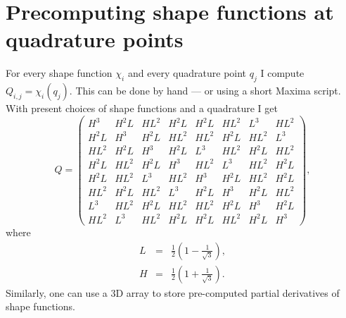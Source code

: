 \documentclass{article}
\begin{document}
\section{Precomputing shape functions at quadrature points}

For every shape function $\chi_i$ and every quadrature point $q_j$ I compute
$Q_{i, j} = \chi_i (q_j)$. This can be done by hand --- or using a short
Maxima script. With present choices of shape functions and a quadrature I get
\begin{equation}
  Q = \left(\begin{array}{llllllll}
    H^3 & H^2 L & HL^2 & H^2 L & H^2 L & HL^2 & L^3 & HL^2\\
    H^2 L & H^3 & H^2 L & HL^2 & HL^2 & H^2 L & HL^2 & L^3\\
    HL^2 & H^2 L & H^3 & H^2 L & L^3 & HL^2 & H^2 L & HL^2\\
    H^2 L & HL^2 & H^2 L & H^3 & HL^2 & L^3 & HL^2 & H^2 L\\
    H^2 L & HL^2 & L^3 & HL^2 & H^3 & H^2 L & HL^2 & H^2 L\\
    HL^2 & H^2 L & HL^2 & L^3 & H^2 L & H^3 & H^2 L & HL^2\\
    L^3 & HL^2 & H^2 L & HL^2 & HL^2 & H^2 L & H^3 & H^2 L\\
    HL^2 & L^3 & HL^2 & H^2 L & H^2 L & HL^2 & H^2 L & H^3
  \end{array} \right), \label{eq:shapefunctions}
\end{equation}
where
\begin{eqnarray*}
  L & = & \frac{1}{2} \left(1 - \frac{1}{\sqrt{3}} \right),\\
  H & = & \frac{1}{2} \left(1 + \frac{1}{\sqrt{3}} \right) .
\end{eqnarray*}
Similarly, one can use a 3D array to store pre-computed partial derivatives of
shape functions.
\end{document}
